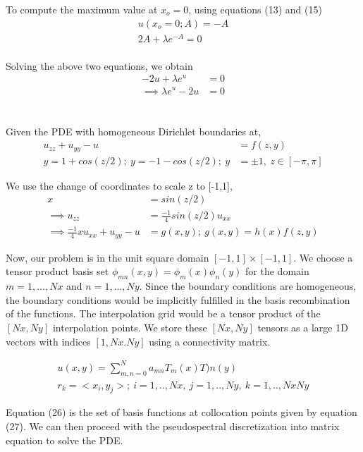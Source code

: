 \documentclass{article}
\begin{document}
To compute the maximum value at $x_o = 0$, using equations (13) and (15)
\begin{align}
    u(x_o = 0; A) = -A \\
    2A + \lambda e^{-A} = 0 \\
\end{align}

Solving the above two equations, we obtain
\begin{align}
    -2u + \lambda e^u &= 0 \\
    \implies \lambda e^u - 2u &= 0
\end{align}


\section{}
Given the PDE with homogeneous Dirichlet boundaries at,
\begin{align}
    u_{zz} + u_{yy} - u &= f(z,y) \\
    y = 1 + cos(z/2);\ y = -1 - cos(z/2);\ y &= \pm1,\ z\in[-\pi, \pi]
\end{align}

We use the change of coordinates to scale z to [-1,1], 
\begin{align}
    x &= sin(z/2) \\
    \implies u_{zz} &= \frac{-1}{4}sin(z/2)u_{xx} \\
    \implies \frac{-1}{4}xu_{xx} + u_{yy} - u &= g(x,y);\ g(x,y) = h(x)f(z,y)
\end{align}

Now, our problem is in the unit square domain $[-1,1]\times[-1,1]$. We choose a tensor product basis set $\phi_{mn}(x,y) = \phi_m(x)\phi_n(y)$ for the domain $m = 1,...,Nx$ and $n = 1,...,Ny$. Since the boundary conditions are homogeneous, the boundary conditions would be implicitly fulfilled in the basis recombination of the functions. The interpolation grid would be a tensor product of the $[Nx,Ny]$ interpolation points. We store these $[Nx,Ny]$ tensors as a large 1D vectors with indices $[1, Nx.Ny]$ using a connectivity matrix.

\begin{align}
    u(x,y) = \sum_{m,n=0}^{N}a_{mn}T_m(x)T)n(y)\\
    r_k = <x_i, y_j>;\ i = 1,..,Nx,\ j = 1,..,Ny,\ k = 1,..,NxNy
\end{align}

Equation (26) is the set of basis functions at collocation points given by equation (27). We can then proceed with the pseudospectral discretization into matrix equation to solve the PDE.
\end{document}
